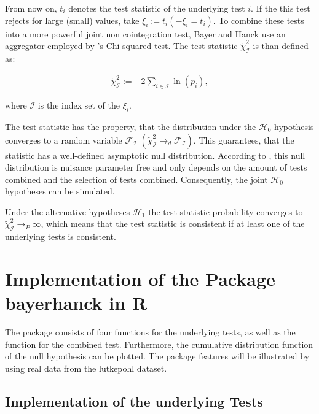 \documentclass[11.5pt,a4paper]{article}
\begin{document}
From now on, \(t_i\) denotes the test statistic of the underlying test
\(i\). If the this test rejects for large (small) values, take
\(\xi_i := t_i (-\xi_i = t_i)\). To combine these tests into a more
powerful joint non cointegration test, Bayer and Hanck use an aggregator
employed by \textcite{Fisher1925}'s Chi-squared test. The test statistic
\(\tilde{\chi}_{\mathcal{I}}^2\) is than defined as:

\begin{align}
  \label{eq:bayer-hanck}
  \tilde{\chi}_{\mathcal{I}}^{2} := -2 \sum_{i \in \mathcal{I}} \ln(p_i),
\end{align}

where \(\mathcal{I}\) is the index set of the \(\xi_i\).

The test statistic has the property, that the distribution under the
\(\mathcal{H}_0\) hypothesis converges to a random variable
\(\mathcal{F}_{\mathcal{I}}\)
\(\left(\tilde{\chi}_{\mathcal{I}}^{2} \rightarrow_{d} \mathcal{F}_{\mathcal{I}} \right)\).
This guarantees, that the statistic has a well-defined asymptotic null
distribution. According to \textcite{Bayerhanck2009}, this null
distribution is nuisance parameter free and only depends on the amount
of tests combined and the selection of tests combined. Consequently, the
joint \(\mathcal{H_0}\) hypotheses can be simulated.

Under the alternative hypotheses \(\mathcal{H}_1\) the test statistic
probability converges to
\(\tilde{\chi}_{\mathcal{I}}^{2} \rightarrow_P \infty\), which means
that the test statistic is consistent if at least one of the underlying
tests is consistent.

\hypertarget{implementation-of-the-package-bayerhanck-in-r}{%
\section{\texorpdfstring{Implementation of the Package
\textbf{bayerhanck} in
R}{Implementation of the Package bayerhanck in R}}\label{implementation-of-the-package-bayerhanck-in-r}}

The package consists of four functions for the underlying tests, as well
as the function for the combined test. Furthermore, the cumulative
distribution function of the null hypothesis can be plotted. The package
features will be illustrated by using real data from the lutkepohl
dataset.

\hypertarget{implementation-of-the-underlying-tests}{%
\subsection{Implementation of the underlying
Tests}\label{implementation-of-the-underlying-tests}}
\end{document}
